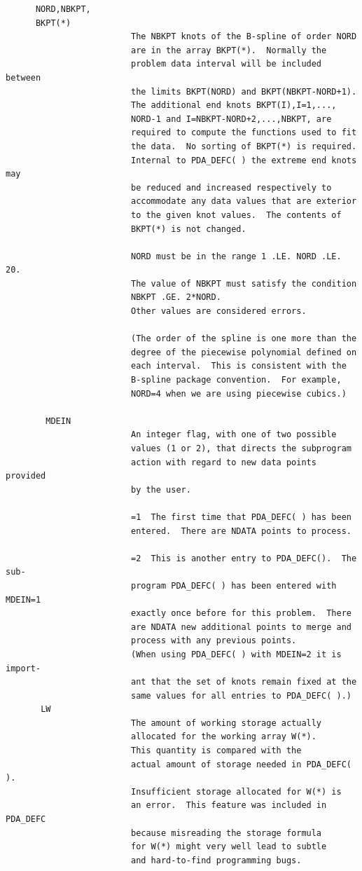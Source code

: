 \documentclass[11pt,twoside]{article}
\begin{document}
\begin{verbatim}
      NORD,NBKPT,
      BKPT(*)
                         The NBKPT knots of the B-spline of order NORD
                         are in the array BKPT(*).  Normally the
                         problem data interval will be included between
                         the limits BKPT(NORD) and BKPT(NBKPT-NORD+1).
                         The additional end knots BKPT(I),I=1,...,
                         NORD-1 and I=NBKPT-NORD+2,...,NBKPT, are
                         required to compute the functions used to fit
                         the data.  No sorting of BKPT(*) is required.
                         Internal to PDA_DEFC( ) the extreme end knots may
                         be reduced and increased respectively to
                         accommodate any data values that are exterior
                         to the given knot values.  The contents of
                         BKPT(*) is not changed.

                         NORD must be in the range 1 .LE. NORD .LE. 20.
                         The value of NBKPT must satisfy the condition
                         NBKPT .GE. 2*NORD.
                         Other values are considered errors.

                         (The order of the spline is one more than the
                         degree of the piecewise polynomial defined on
                         each interval.  This is consistent with the
                         B-spline package convention.  For example,
                         NORD=4 when we are using piecewise cubics.)

        MDEIN
                         An integer flag, with one of two possible
                         values (1 or 2), that directs the subprogram
                         action with regard to new data points provided
                         by the user.

                         =1  The first time that PDA_DEFC( ) has been
                         entered.  There are NDATA points to process.

                         =2  This is another entry to PDA_DEFC().  The sub-
                         program PDA_DEFC( ) has been entered with MDEIN=1
                         exactly once before for this problem.  There
                         are NDATA new additional points to merge and
                         process with any previous points.
                         (When using PDA_DEFC( ) with MDEIN=2 it is import-
                         ant that the set of knots remain fixed at the
                         same values for all entries to PDA_DEFC( ).)
       LW
                         The amount of working storage actually
                         allocated for the working array W(*).
                         This quantity is compared with the
                         actual amount of storage needed in PDA_DEFC( ).
                         Insufficient storage allocated for W(*) is
                         an error.  This feature was included in PDA_DEFC
                         because misreading the storage formula
                         for W(*) might very well lead to subtle
                         and hard-to-find programming bugs.


\end{verbatim}
\end{document}
